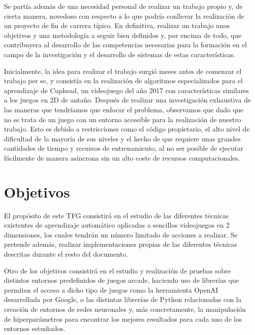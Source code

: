 \documentclass[11pt,spanish,listoffigures,listoftables]{tfgetsinf}
\begin{document}
Se partía además de una necesidad personal de realizar un trabajo propio y, de cierta manera, novedoso con respecto a lo que podría conllevar la realización de un proyecto de fin de carrera típico. En definitiva, realizar un trabajo unos objetivos y una metodología a seguir bien definidos y, por encima de todo, que contribuyera al desarrollo de las competencias necesarias para la formación en el campo de la investigación y el desarrollo de sistemas de estas características. 

Inicialmente, la idea para realizar el trabajo surgió meses antes de comenzar el trabajo per se, y consistía en la realización de algoritmos especializados para el aprendizaje de Cuphead, un videojuego del año 2017 con características similares a los juegos en 2D de antaño. Después de realizar una investigación exhaustiva de las maneras que tendríamos que enfocar el problema, observamos que dado que no se trata de un juego con un entorno accesible para la realización de nuestro trabajo. Esto es debido a restricciones como el código propietario, el alto nivel de dificultad de la mayoría de sus niveles y el hecho de que requiere unas grandes cantidades de tiempo y recursos de entrenamiento, al no ser posible de ejecutar fácilmente de manera asíncrona sin un alto coste de recursos computacionales. 

\section{Objetivos}

El propósito de este TFG consistirá en el estudio de las diferentes técnicas existentes de aprendizaje automático aplicadas a sencillos videojuegos en 2 dimensiones, los cuales tendrán un número limitado de acciones a realizar. Se pretende además, realizar implementaciones propias de las diferentes técnicas descritas durante el resto del documento. \par 

Otro de los objetivos consistirá en el estudio y realización de pruebas sobre distintos entornos predefinidos de juegos arcade, haciendo uso de librerías que permiten el acceso a dicho tipo de juegos como la herramienta OpenAI desarrollada por Google, o las distintas librerías de Python relacionadas con la creación de entornos de redes neuronales y, más concretamente, la manipulación de hiperparámetros para encontrar los mejores resultados para cada uno de los entornos estudiados. \par 
\end{document}
